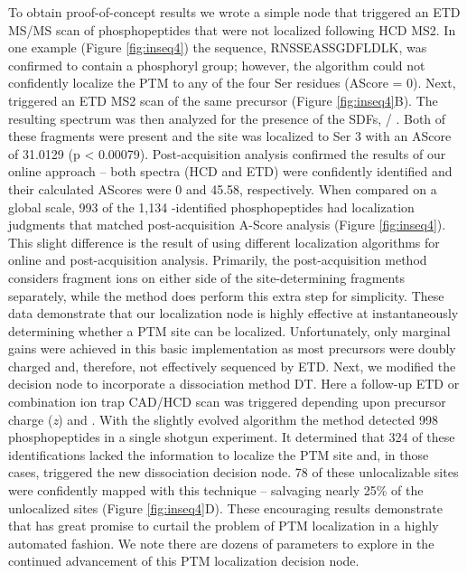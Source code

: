 To obtain proof-of-concept results we wrote a simple \inseq{} node that triggered an ETD MS/MS scan of phosphopeptides that were not localized following HCD MS2. In one example (Figure \ref{fig:inseq4}) the sequence, RNSSEASSGDFLDLK, was confirmed to contain a phosphoryl group; however, the \inseq{} algorithm could not confidently localize the PTM to any of the four Ser residues (AScore = 0). Next, \inseq{} triggered an ETD MS2 scan of the same precursor (Figure \ref{fig:inseq4}B). The resulting spectrum was then analyzed for the presence of the SDFs,  / . Both of these fragments were present and the site was localized to Ser 3 with an AScore of 31.0129 (p < 0.00079). Post-acquisition analysis confirmed the results of our online \inseq{} approach -- both spectra (HCD and ETD) were confidently identified and their calculated AScores were 0 and 45.58, respectively. When compared on a global scale, 993 of the 1,134 \inseq{}-identified phosphopeptides had localization judgments that matched post-acquisition A-Score analysis (Figure \ref{fig:inseq4}). This slight difference is the result of using different localization algorithms for online and post-acquisition analysis. Primarily, the post-acquisition method considers fragment ions on either side of the site-determining fragments separately, while the \inseq{} method does perform this extra step for simplicity.\cite{esips,ascore} These data demonstrate that our localization node is highly effective at instantaneously determining whether a PTM site can be localized. Unfortunately, only marginal gains were achieved in this basic implementation as most precursors were doubly charged and, therefore, not effectively sequenced by ETD. Next, we modified the \inseq{} decision node to incorporate a dissociation method DT. Here a follow-up ETD or combination ion trap CAD/HCD scan was triggered depending upon precursor charge (\textit{z}) and \mz{}. With the slightly evolved algorithm the \inseq{} method detected 998 phosphopeptides in a single shotgun experiment. It determined that 324 of these identifications lacked the information to localize the PTM site and, in those cases, triggered the new dissociation decision node. 78 of these unlocalizable sites were confidently mapped with this technique -- salvaging nearly 25\% of the unlocalized sites (Figure \ref{fig:inseq4}D). These encouraging results demonstrate that \inseq{} has great promise to curtail the problem of PTM localization in a highly automated fashion. We note there are dozens of parameters to explore in the continued advancement of this PTM localization decision node.

